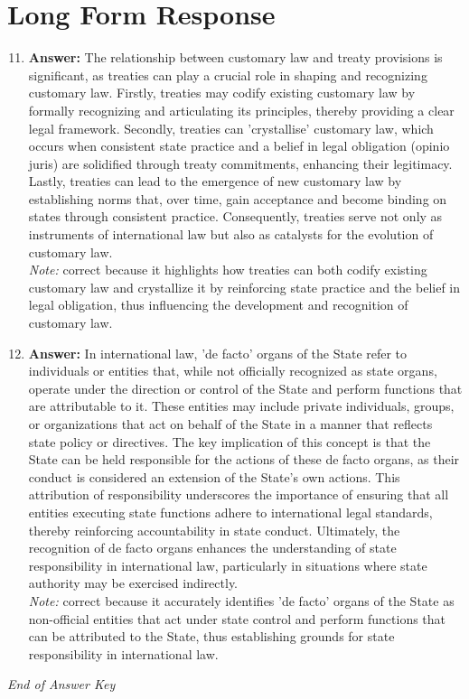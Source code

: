 \documentclass[12pt]{article}
\begin{document}
\section*{Long Form Response}
\begin{enumerate}[label=\arabic*.]
\setcounter{enumi}{10}
\item \textbf{Answer:} The relationship between customary law and treaty provisions is significant, as treaties can play a crucial role in shaping and recognizing customary law. Firstly, treaties may codify existing customary law by formally recognizing and articulating its principles, thereby providing a clear legal framework. Secondly, treaties can 'crystallise' customary law, which occurs when consistent state practice and a belief in legal obligation (opinio juris) are solidified through treaty commitments, enhancing their legitimacy. Lastly, treaties can lead to the emergence of new customary law by establishing norms that, over time, gain acceptance and become binding on states through consistent practice. Consequently, treaties serve not only as instruments of international law but also as catalysts for the evolution of customary law.
\\ \textit{Note:} correct because it highlights how treaties can both codify existing customary law and crystallize it by reinforcing state practice and the belief in legal obligation, thus influencing the development and recognition of customary law.
\item \textbf{Answer:} In international law, 'de facto' organs of the State refer to individuals or entities that, while not officially recognized as state organs, operate under the direction or control of the State and perform functions that are attributable to it. These entities may include private individuals, groups, or organizations that act on behalf of the State in a manner that reflects state policy or directives. The key implication of this concept is that the State can be held responsible for the actions of these de facto organs, as their conduct is considered an extension of the State's own actions. This attribution of responsibility underscores the importance of ensuring that all entities executing state functions adhere to international legal standards, thereby reinforcing accountability in state conduct. Ultimately, the recognition of de facto organs enhances the understanding of state responsibility in international law, particularly in situations where state authority may be exercised indirectly.
\\ \textit{Note:} correct because it accurately identifies 'de facto' organs of the State as non-official entities that act under state control and perform functions that can be attributed to the State, thus establishing grounds for state responsibility in international law.
\end{enumerate}

\vfill
\noindent\textit{End of Answer Key}
\end{document}
